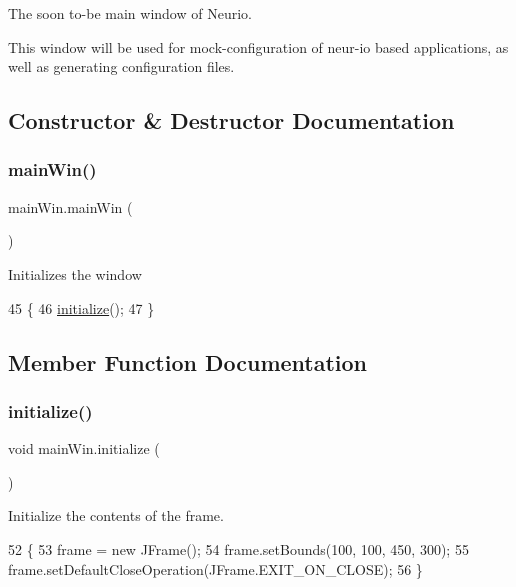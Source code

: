 The soon to-\/be main window of Neurio.

This window will be used for mock-\/configuration of neur-\/io based applications, as well as generating configuration files. 

\subsection{Constructor \& Destructor Documentation}
\mbox{\label{classmain_win_a49c22fb02a4187e69d8dd16607446e16}} 
\subsubsection{\texorpdfstring{main\+Win()}{mainWin()}}
{\footnotesize\ttfamily main\+Win.\+main\+Win (\begin{DoxyParamCaption}{ }\end{DoxyParamCaption})}

Initializes the window 
\begin{DoxyCode}
45                      \{
46         \hyperlink{classmain_win_ad7d141c1498081d02e50ec3f8beb5013}{initialize}();
47     \}
\end{DoxyCode}


\subsection{Member Function Documentation}
\mbox{\label{classmain_win_ad7d141c1498081d02e50ec3f8beb5013}} 
\subsubsection{\texorpdfstring{initialize()}{initialize()}}
{\footnotesize\ttfamily void main\+Win.\+initialize (\begin{DoxyParamCaption}{ }\end{DoxyParamCaption})\hspace{0.3cm}{\ttfamily [private]}}

Initialize the contents of the frame. 
\begin{DoxyCode}
52                               \{
53         frame = \textcolor{keyword}{new} JFrame();
54         frame.setBounds(100, 100, 450, 300);
55         frame.setDefaultCloseOperation(JFrame.EXIT\_ON\_CLOSE);
56     \}
\end{DoxyCode}
\mbox{\label{classmain_win_a8fcc6dd4f93af4dd5a72a74c461a1fe0}} 

